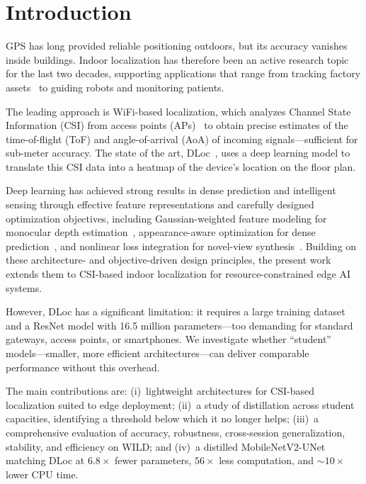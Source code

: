 \documentclass[conference,a4paper]{IEEEtran}
\begin{document}
\section{Introduction}
GPS has long provided reliable positioning outdoors, but its accuracy vanishes inside buildings. Indoor localization has therefore been an active research topic for the last two decades, supporting applications that range from tracking factory assets~\cite{digitaltwin2025framework} to guiding robots and monitoring patients.

The leading approach is WiFi-based localization, which analyzes Channel State Information (CSI) from access points (APs)~\cite{ayyalasomayajula2020deep} to obtain precise estimates of the time-of-flight (ToF) and angle-of-arrival (AoA) of incoming signals---sufficient for sub-meter accuracy. The state of the art, DLoc~\cite{ayyalasomayajula2020deep}, uses a deep learning model to translate this CSI data into a heatmap of the device's location on the floor plan.

Deep learning has achieved strong results in dense prediction and intelligent sensing through effective feature representations and carefully designed optimization objectives, including Gaussian-weighted feature modeling for monocular depth estimation~\cite{elshazly2019gaussian}, appearance-aware optimization for dense prediction~\cite{elshazly2019appearance}, and nonlinear loss integration for novel-view synthesis~\cite{elshazly2024nonlinear}. Building on these architecture- and objective-driven design principles, the present work extends them to CSI-based indoor localization for resource-constrained edge AI systems.

However, DLoc has a significant limitation: it requires a large training dataset and a ResNet model with 16.5 million parameters---too demanding for standard gateways, access points, or smartphones. We investigate whether ``student'' models---smaller, more efficient architectures---can deliver comparable performance without this overhead.

The main contributions are: (i)~lightweight architectures for CSI-based localization suited to edge deployment; (ii)~a study of distillation across student capacities, identifying a threshold below which it no longer helps; (iii)~a comprehensive evaluation of accuracy, robustness, cross-session generalization, stability, and efficiency on WILD; and (iv)~a distilled MobileNetV2-UNet matching DLoc at $6.8\times$ fewer parameters, $56\times$ less computation, and ${\sim}10\times$ lower CPU time.
\end{document}
